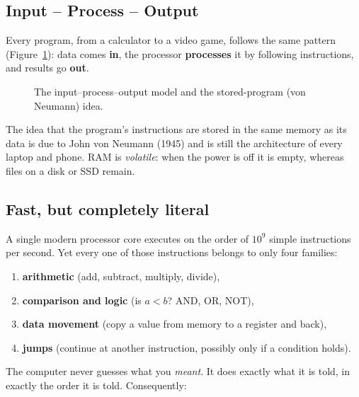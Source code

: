\documentclass[11pt,a4paper]{article}
\newcommand{\term}[1]{\textbf{\color{ink}#1}}
\begin{document}
\subsection{Input -- Process -- Output}
Every program, from a calculator to a video game, follows the same pattern (Figure~\ref{fig:ipo}): data comes \term{in}, the processor \term{processes} it by following instructions, and results go \term{out}.

\begin{figure}[h]\centering
{}
\caption{The input--process--output model and the stored-program (von Neumann) idea.}\label{fig:ipo}
\end{figure}

The idea that the program's instructions are stored in the same memory as its data is due to John von Neumann (1945) and is still the architecture of every laptop and phone. RAM is \emph{volatile}: when the power is off it is empty, whereas files on a disk or SSD remain.

\subsection{Fast, but completely literal}
A single modern processor core executes on the order of $10^{9}$ simple instructions per second. Yet every one of those instructions belongs to only four families:
\begin{enumerate}[leftmargin=*,itemsep=1pt]
  \item \textbf{arithmetic} (add, subtract, multiply, divide),
  \item \textbf{comparison and logic} (is $a<b$? AND, OR, NOT),
  \item \textbf{data movement} (copy a value from memory to a register and back),
  \item \textbf{jumps} (continue at another instruction, possibly only if a condition holds).
\end{enumerate}
The computer never guesses what you \emph{meant}. It does exactly what it is told, in exactly the order it is told. Consequently:
\end{document}
